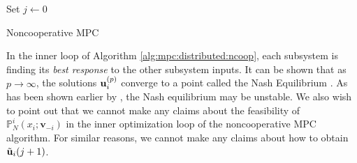 \begin{algorithm}
   Set $j \leftarrow 0$ \\
\caption{Noncooperative MPC}
\label{alg:mpc:distributed:ncoop}
\end{algorithm}

In the inner loop of Algorithm \ref{alg:mpc:distributed:ncoop}, each
subsystem is finding its {\em{best response}} to the other subsystem
inputs. It can be shown that as $p \rightarrow \infty$, the
solutions $\mathbf{u}_i^{(p)}$ converge to a point called the Nash
Equilibrium \citep{basar:olsder:1999}. As has been shown earlier by
\citet[Sec 4.3.1]{venkat:2006}, the Nash equilibrium may be
unstable. We also wish to point out that we cannot make any claims
about the feasibility of $\mathbb{P}_N^i(x_i;\mathbf{v}_{-i})$ in the
inner optimization loop of the noncooperative MPC algorithm. For
similar reasons, we cannot make any claims about how to obtain
$\tilde{\mathbf{u}}_i(j+1)$.

